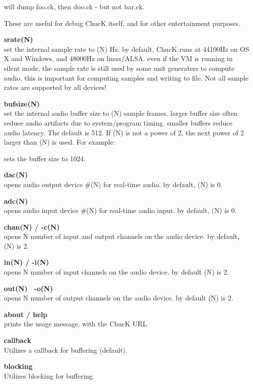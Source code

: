 will dump foo.ck, then doo.ck - but not bar.ck. 

These are useful for debug ChucK itself, and for other entertainment purposes. 

{\bf \doubledash srate(N)}\\
set the internal sample rate to (N) Hz. by default,  ChucK runs at 44100Hz on OS X and Windows, and 48000Hz on linux/ALSA. even if the VM is running in \doubledash silent mode, the sample rate is still used by some unit generaters to compute audio, this is important for computing samples and writing to file. Not all sample rates are supported by all devices! 

{\bf \doubledash bufsize(N)}\\
set the internal audio buffer size to (N) sample frames. larger buffer size often reduce audio artifacts due to system/program timing. smaller buffers reduce audio latency. The default is 512. If (N) is not a power of 2, the next power of 2 larger than (N) is used. For example: 


sets the buffer size to 1024. 

{\bf \doubledash dac(N)}\\
opens audio output device \#(N) for real-time audio. by default,  (N) is 0. 

{\bf \doubledash adc(N)}\\
opens audio input device \#(N) for real-time audio input. by default, (N) is 0. 

{\bf \doubledash chan(N) / -c(N)}\\
opens N number of input and output channels on the audio device. by default, (N) is 2.

{\bf \doubledash in(N) / -i(N)}\\
opens N number of input channels on the audio device. by default (N) is 2.

{\bf \doubledash out(N) \ -o(N)}\\
opens N number of output channels on the audio device. by default (N) is 2.

{\bf \doubledash about / \doubledash help}\\
prints the usage message, with the ChucK URL

{\bf \doubledash callback}\\
Utilizes a callback for buffering (default).

{\bf \doubledash blocking}\\
Utilizes blocking for buffering.
